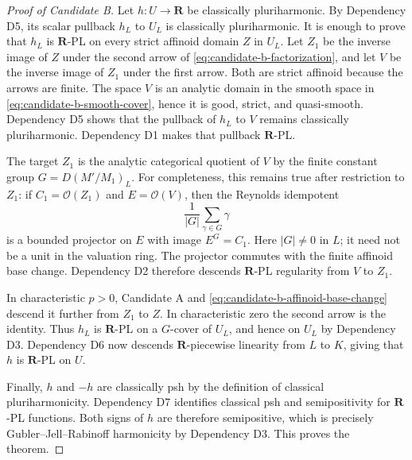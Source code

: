 \begin{proof}[Proof of Candidate B]
Let \(h:U\to\mathbf R\) be classically pluriharmonic.  By Dependency D5,
its scalar pullback \(h_L\) to \(U_L\) is classically pluriharmonic.  It is
enough to prove that \(h_L\) is \(\mathbf R\)-PL on every strict affinoid
domain \(Z\) in \(U_L\).  Let \(Z_1\) be the inverse image of \(Z\) under
the second arrow of \eqref{eq:candidate-b-factorization}, and let \(V\) be
the inverse image of \(Z_1\) under the first arrow.  Both are strict
affinoid because the arrows are finite.  The space \(V\) is an analytic
domain in the smooth space in \eqref{eq:candidate-b-smooth-cover}, hence it
is good, strict, and quasi-smooth.  Dependency D5 shows that the pullback of
\(h_L\) to \(V\) remains classically pluriharmonic.  Dependency D1 makes
that pullback \(\mathbf R\)-PL.

The target \(Z_1\) is the analytic categorical quotient of \(V\) by the
finite constant group \(G=D(M'/M_1)_L\).  For completeness, this remains
true after restriction to \(Z_1\): if \(C_1=\mathcal O(Z_1)\) and
\(E=\mathcal O(V)\), then the Reynolds idempotent
\[
                         \frac1{|G|}\sum_{\gamma\in G}\gamma
\]
is a bounded projector on \(E\) with image \(E^G=C_1\).  Here
\(|G|\neq0\) in \(L\); it need not be a unit in the valuation ring.  The
projector commutes with the finite affinoid base change.  Dependency D2
therefore descends \(\mathbf R\)-PL regularity from \(V\) to \(Z_1\).

In characteristic \(p>0\), Candidate A and
\eqref{eq:candidate-b-affinoid-base-change} descend it further from
\(Z_1\) to \(Z\).  In characteristic zero the second arrow is the identity.
Thus \(h_L\) is \(\mathbf R\)-PL on a \(G\)-cover of \(U_L\), and hence on
\(U_L\) by Dependency D3.  Dependency D6 now descends
\(\mathbf R\)-piecewise linearity from \(L\) to \(K\), giving that \(h\) is
\(\mathbf R\)-PL on \(U\).

Finally, \(h\) and \(-h\) are classically psh by the definition of
classical pluriharmonicity.  Dependency D7 identifies classical psh and
semipositivity for \(\mathbf R\)-PL functions.  Both signs of \(h\) are
therefore semipositive, which is precisely Gubler--Jell--Rabinoff
harmonicity by Dependency D3.  This proves the theorem.
\end{proof}
